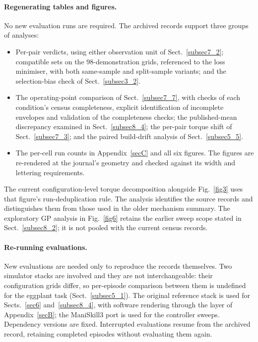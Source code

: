 \documentclass[pdflatex,iicol,sn-apa]{sn-jnl}
\theoremstyle{remark}
\begin{document}
\begin{appendices}
\paragraph{Regenerating tables and figures.}
No new evaluation runs are required. The archived records support three groups of analyses:
\begin{itemize}
\item Per-pair verdicts, using either observation unit of Sect.~\ref{subsec7_2}; compatible sets
on the 98-demonstration grids, referenced to the loss minimiser, with both same-sample and
split-sample variants; and the selection-bias check of Sect.~\ref{subsec3_2}.
\item The operating-point comparison of Sect.~\ref{subsec7_7}, with checks of each condition's
census completeness, explicit identification of incomplete envelopes and validation of the completeness checks; the published-mean discrepancy examined in
Sect.~\ref{subsec8_4}; the per-pair torque shift of Sect.~\ref{subsec7_3}; and the paired
build-drift analysis of Sect.~\ref{subsec5_5}.
\item The per-cell run counts in Appendix~\ref{secC} and all six figures. The figures are
re-rendered at the journal's geometry and checked against its width and lettering requirements.
\end{itemize}
The current configuration-level torque decomposition alongside Fig.~\ref{fig3} uses that figure's
run-deduplication rule. The analysis identifies the source records and distinguishes them from those used in the older mechanism summary.
The exploratory GP analysis in Fig.~\ref{fig6} retains the earlier sweep scope stated in
Sect.~\ref{subsec8_2}; it is not pooled with the current census records.

\paragraph{Re-running evaluations.}
New evaluations are needed only to reproduce the records themselves. Two
simulator stacks are involved and they are not interchangeable: their configuration grids differ, so
per-episode comparison between them is undefined for the eggplant task (Sect.~\ref{subsec5_1}). The
original reference stack is used for Sects.~\ref{sec6} and~\ref{subsec8_4}, with software
rendering through the layer of Appendix~\ref{secB}; the ManiSkill3 port is used for the
controller sweeps. Dependency versions are fixed. Interrupted evaluations resume from the archived record, retaining completed episodes without evaluating them again.


\end{appendices}
\end{document}
